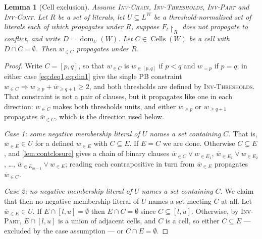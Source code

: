 \documentclass[11pt,a4paper]{article}
\theoremstyle{plain}
\newtheorem{lemmaN}{Lemma}
\theoremstyle{definition}
\theoremstyle{remark}
\newcommand{\fname}[1]{\ensuremath{\operatorname{#1}}}
\newcommand{\Cells}{\fname{Cells}}
\newcommand{\dm}{\fname{dom}}
\newcommand{\atge}[2]{#1_{\geq #2}}
\newcommand{\ateq}[2]{#1_{= #2}}
\newcommand{\atin}[3]{#1_{\in[#2,#3]}}
\newcommand{\natge}[2]{\overline{#1}_{\geq #2}}
\newcommand{\atset}[2]{#1_{\in #2}}
\newcommand{\natset}[2]{\overline{#1}_{\in #2}}
\newcommand{\inv}[1]{\textnormal{\textsc{Inv-#1}}}
\newcommand{\invChain}{\inv{Chain}}
\newcommand{\invThresholds}{\inv{Thresholds}}
\newcommand{\invPart}{\inv{Part}}
\newcommand{\invCont}{\inv{Cont}}
\begin{document}
\begin{lemmaN}[Cell exclusion]
\label{lem:cell}
Assume \invChain{}, \invThresholds{}, \invPart{} and \invCont{}.  Let $R$ be a set of
literals, let $U\subseteq L^W$ be a threshold-normalised set of literals each of which
propagates under $R$, suppose $F_t\!\restriction_R$ does not propagate to conflict, and
write $D=\dm_U(W)$.  Let $C\in\Cells(W)$ be a cell with $D\cap C=\emptyset$.
Then $\natset{w}{C}$ propagates under $R$.
\end{lemmaN}

\begin{proof}
Write $C=[p,q]$, so that $\atset{w}{C}$ is $\atin{w}{p}{q}$ if $p<q$ and
$\ateq{w}{p}$ if $p=q$; in either case \cref{eq:deq1,eq:din1} give the single PB
constraint $\atset{w}{C}\Rightarrow\atge{w}{p}+\natge{w}{q+1}\geq 2$, and both
thresholds are defined by \invThresholds{}.  That constraint is not a pair of clauses, but it
propagates like one in each direction: $\atset{w}{C}$ makes both thresholds units, and
either $\natge{w}{p}$ or $\atge{w}{q+1}$ propagates $\natset{w}{C}$, which is
the direction used below.

\emph{Case 1: some negative membership literal of $U$ names a set containing $C$.}
That is, $\natset{w}{E}\in U$ for a defined $\atset{w}{E}$ with $C\subseteq E$.
If $E=C$ we are done.  Otherwise $C\subsetneq E$, and \cref{lem:contclosure}
gives a chain of binary clauses $\natset{w}{C}\vee\atset{w}{E_1}$,
$\natset{w}{E_1}\vee\atset{w}{E_2}$, \dots,
$\natset{w}{E_{m-1}}\vee\atset{w}{E}$; reading each contrapositive in turn from
$\natset{w}{E}$ propagates $\natset{w}{C}$.

\emph{Case 2: no negative membership literal of $U$ names a set containing $C$.}
We claim that then no negative membership literal of $U$ names a set meeting $C$ at
all.  Let $\natset{w}{E}\in U$.  If $E\cap[l,u]=\emptyset$ then
$E\cap C=\emptyset$ since $C\subseteq[l,u]$.
Otherwise, by \invPart{}, $E\cap[l,u]$ is a union of adjacent cells, and $C$ is
a cell, so either $C\subseteq E$ --- excluded by the case assumption --- or
$C\cap E=\emptyset$.


\end{proof}
\end{document}
